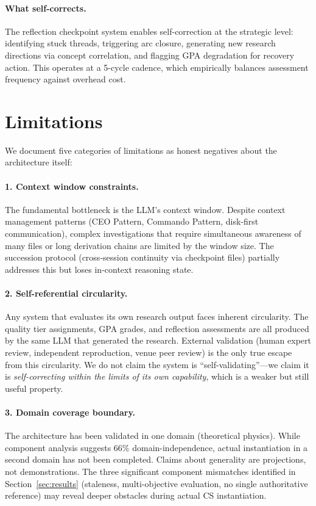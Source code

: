 \documentclass[11pt,a4paper]{article}
\begin{document}
\paragraph{What self-corrects.}
The reflection checkpoint system enables self-correction at the strategic level:
identifying stuck threads, triggering arc closure, generating new research
directions via concept correlation, and flagging GPA degradation for recovery
action. This operates at a 5-cycle cadence, which empirically balances assessment
frequency against overhead cost.

\section{Limitations}
\label{sec:limitations}

We document five categories of limitations as honest negatives about the architecture
itself:

\paragraph{1. Context window constraints.}
The fundamental bottleneck is the LLM's context window. Despite context management
patterns (CEO Pattern, Commando Pattern, disk-first communication), complex
investigations that require simultaneous awareness of many files or long derivation
chains are limited by the window size. The succession protocol (cross-session
continuity via checkpoint files) partially addresses this but loses in-context
reasoning state.

\paragraph{2. Self-referential circularity.}
Any system that evaluates its own research output faces inherent circularity.
The quality tier assignments, GPA grades, and reflection assessments are all
produced by the same LLM that generated the research. External validation
(human expert review, independent reproduction, venue peer review) is the
only true escape from this circularity. We do not claim the system is
``self-validating''---we claim it is \emph{self-correcting within the limits
of its own capability}, which is a weaker but still useful property.

\paragraph{3. Domain coverage boundary.}
The architecture has been validated in one domain (theoretical physics). While
component analysis suggests 66\% domain-independence, actual instantiation in
a second domain has not been completed. Claims about generality are projections,
not demonstrations. The three significant component mismatches identified in
Section~\ref{sec:results} (staleness, multi-objective evaluation, no single
authoritative reference) may reveal deeper obstacles during actual CS instantiation.
\end{document}
